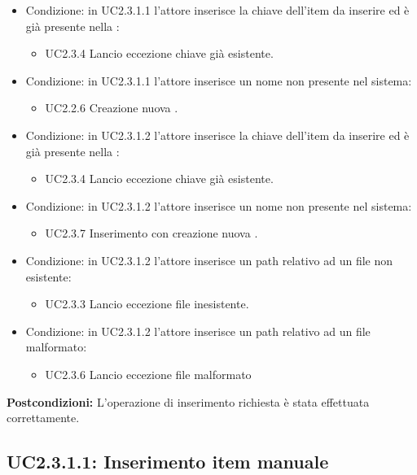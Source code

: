 \documentclass{scalatekids-article}
\begin{document}
\begin{itemize}
\item Condizione: in UC2.3.1.1  l'attore inserisce la chiave dell'item da inserire ed è già presente nella :
  \begin{itemize}
  \item UC2.3.4 Lancio eccezione chiave già esistente.
  \end{itemize}
\item Condizione: in UC2.3.1.1 l'attore inserisce un nome  non presente nel sistema:
  \begin{itemize}
  \item UC2.2.6 Creazione nuova . %
  \end{itemize}
\item Condizione: in UC2.3.1.2  l'attore inserisce la chiave dell'item da inserire ed è già presente nella :
  \begin{itemize}
  \item UC2.3.4 Lancio eccezione chiave già esistente.
  \end{itemize}
\item Condizione: in UC2.3.1.2 l'attore inserisce un nome  non presente nel sistema:
  \begin{itemize}
  \item UC2.3.7 Inserimento con creazione nuova .
  \end{itemize}
\item Condizione: in UC2.3.1.2 l'attore inserisce un path relativo ad un file non esistente:
  \begin{itemize}
  \item UC2.3.3 Lancio eccezione file inesistente.
  \end{itemize}
\item Condizione: in UC2.3.1.2 l'attore inserisce un path relativo ad un file malformato: %
  \begin{itemize}
  \item UC2.3.6 Lancio eccezione file malformato
  \end{itemize}
\end{itemize}
\textbf{Postcondizioni:} L'operazione di inserimento richiesta è stata effettuata correttamente.

\subsection{UC2.3.1.1: Inserimento item manuale}
\end{document}
